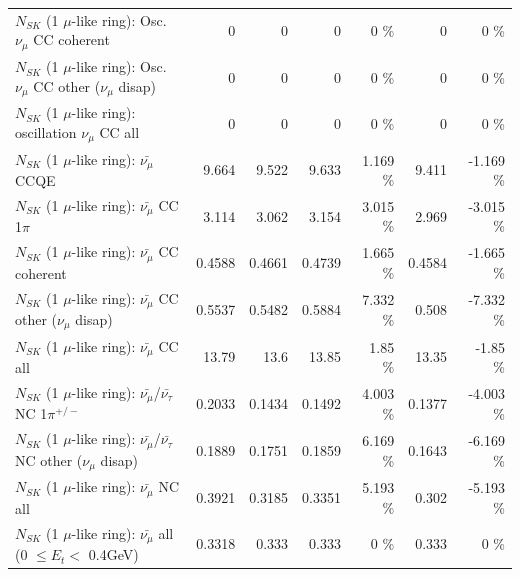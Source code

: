 \begin{table}
\begin{tabular}{| l | r | r | r  r | r  r |}
                        $N_{SK}$ (1 $\mu$-like ring): Osc. $\nu_\mu$ CC coherent &               0 &               0 &               0 &        0 \%  &               0 &        0 \%  \\ 
         $N_{SK}$ (1 $\mu$-like ring): Osc. $\nu_\mu$ CC other ($\nu_\mu$ disap) &               0 &               0 &               0 &        0 \%  &               0 &        0 \%  \\ 
                      $N_{SK}$ (1 $\mu$-like ring): oscillation $\nu_\mu$ CC all &               0 &               0 &               0 &        0 \%  &               0 &        0 \%  \\ 
\hline
\hline
                              $N_{SK}$ (1 $\mu$-like ring): $\bar{\nu_\mu}$ CCQE &           9.664 &           9.522 &           9.633 &    1.169 \%  &           9.411 &   -1.169 \%  \\ 
                         $N_{SK}$ (1 $\mu$-like ring): $\bar{\nu_\mu}$ CC 1$\pi$ &           3.114 &           3.062 &           3.154 &    3.015 \%  &           2.969 &   -3.015 \%  \\ 
                       $N_{SK}$ (1 $\mu$-like ring): $\bar{\nu_\mu}$ CC coherent &          0.4588 &          0.4661 &          0.4739 &    1.665 \%  &          0.4584 &   -1.665 \%  \\ 
        $N_{SK}$ (1 $\mu$-like ring): $\bar{\nu_\mu}$ CC other ($\nu_\mu$ disap) &          0.5537 &          0.5482 &          0.5884 &    7.332 \%  &           0.508 &   -7.332 \%  \\ 
                          $N_{SK}$ (1 $\mu$-like ring): $\bar{\nu_{\mu}}$ CC all &           13.79 &            13.6 &           13.85 &     1.85 \%  &           13.35 &    -1.85 \%  \\ 
\hline
  $N_{SK}$ (1 $\mu$-like ring): $\bar{\nu_\mu}$/$\bar{\nu_\tau}$ NC 1$\pi^{+/-}$ &          0.2033 &          0.1434 &          0.1492 &    4.003 \%  &          0.1377 &   -4.003 \%  \\ 
$N_{SK}$ (1 $\mu$-like ring): $\bar{\nu_\mu}$/$\bar{\nu_\tau}$ NC other ($\nu_\mu$ disap) &          0.1889 &          0.1751 &          0.1859 &    6.169 \%  &          0.1643 &   -6.169 \%  \\ 
                          $N_{SK}$ (1 $\mu$-like ring): $\bar{\nu_{\mu}}$ NC all &          0.3921 &          0.3185 &          0.3351 &    5.193 \%  &           0.302 &   -5.193 \%  \\ 
\hline
   $N_{SK}$ (1 $\mu$-like ring): $\bar{\nu_{\mu}}$ all (0 $\leq E_{t} <$ 0.4GeV) &          0.3318 &           0.333 &           0.333 &        0 \%  &           0.333 &        0 \%  \\ 

\end{tabular}
\end{table}
